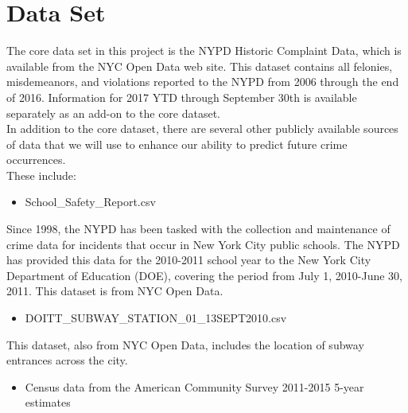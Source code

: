 \documentclass[10pt,journal,compsoc]{IEEEtran}
\begin{document}

\section{Data Set}

The core data set in this project is the NYPD Historic Complaint Data, which is available from the NYC Open Data web site. This dataset contains all felonies, misdemeanors, and violations reported to the NYPD from 2006 through the end of 2016. Information for 2017 YTD through September 30th is available separately as an add-on to the core dataset.\\

In addition to the core dataset, there are several other publicly available sources of data that we
will use to enhance our ability to predict future crime occurrences. \\

These include:
\begin{itemize}
 \item School\_Safety\_Report.csv
\end{itemize}

Since 1998, the NYPD has been tasked with the collection and
maintenance of crime data for incidents that occur in New York City public schools. The NYPD has provided this data for the 2010-2011 school year to the New York City Department of Education (DOE), covering the period from July 1, 2010-June 30, 2011. This dataset is from NYC Open Data.\\

\begin{itemize}
 \item DOITT\_SUBWAY\_STATION\_01\_13SEPT2010.csv
\end{itemize}

This dataset, also from NYC Open Data, includes the location of subway entrances across the city.\\

\begin{itemize}
 \item Census data from the American Community Survey 2011-2015 5-year estimates
\end{itemize}
\end{document}
